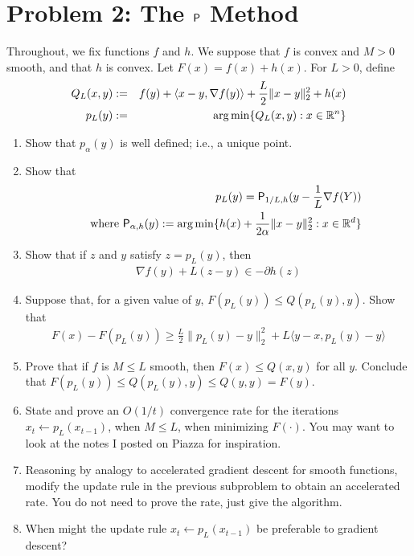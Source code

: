 \documentclass[12pt]{article}
\begin{document}
\section*{Problem 2: The $\mathsf{P}$ Method} 
Throughout, we fix functions $f$ and $h$. We suppose that $f$ is convex and $M > 0$ smooth, and that $h$ is convex. Let $F(x) = f(x) + h(x)$. For $L > 0$, define
	\begin{eqnarray}
	Q_{L}(x,y) &:=& f(y) + \langle x - y, \nabla f(y) \rangle + \frac{L}{2}\|x -y\|_2^2 + h(x)\\
	p_{L}(y) &:=& \arg\min\{ Q_{L}(x,y): x \in \mathbb{R}^n\}
	\end{eqnarray}
\begin{enumerate}
	\item Show that $p_{\alpha}(y)$ is well defined; i.e., a unique point.
	\item Show that 
	\begin{eqnarray}
	&&p_{L}(y)  = \mathsf{P}_{1/L,h}( y- \frac{1}{L} \nabla f(Y))\\
	 &&\text{ where } \mathsf{P}_{\alpha,h}(y) := \arg\min\{h(x) + \frac{1}{2\alpha}\|x-y\|^2_2:  x \in \mathbb{R}^d\}
	\end{eqnarray}
	\item Show that if $z$ and $y$ satisfy $z = p_{L}(y)$, then
	\begin{eqnarray}
	\nabla f(y) + L(z-y) \in -\partial h(z)
	\end{eqnarray}
	\item Suppose that, for a given value of $y$, $F(p_L(y)) \le Q(p_L(y),y)$. Show that
	\begin{eqnarray}
	F(x) - F(p_L(y)) \ge \frac{L}{2}\|p_L(y) - y\|_2^2 + L\langle y - x, p_L(y) - y \rangle
	\end{eqnarray}
	\item Prove that if $f$ is $M \le L$ smooth, then $F(x) \le Q(x,y)$ for all $y$. Conclude that $F(p_{L}(y)) \le Q(p_{L}(y),y) \le Q(y,y) = F(y)$. 
	\item State and prove an $O(1/t)$ convergence rate for the iterations $x_{t} \leftarrow p_L(x_{t-1})$, when $M \le L$, when minimizing $F(\cdot)$. You may want to look at the notes I posted on Piazza for inspiration.
	\item Reasoning by analogy to accelerated gradient descent for smooth functions, modify the update rule in the previous subproblem to obtain an accelerated rate. You do not need to prove the rate, just give the algorithm. 
	\item When might the update rule $x_{t} \leftarrow p_L(x_{t-1})$ be preferable to gradient descent? 
\end{enumerate}
\end{document}
